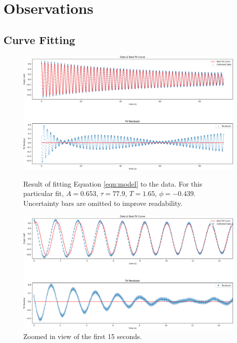 \documentclass[aps,twocolumn,secnumarabic,nobalancelastpage,amsmath,amssymb,nofootinbib]{revtex4}
\begin{document}

\section{Observations}

\subsection{Curve Fitting}

\begin{figure}[htb]
    \includegraphics[width=0.725\linewidth]{fit1.png}
    \caption{Result of fitting Equation \ref{eqn:model} to the data. For this particular fit, \(A = 0.653\),
    \(\tau = 77.9\), \(T = 1.65\), \(\phi = -0.439\). Uncertainty bars are omitted to improve readability.}
    \label{fig:fit}
    \includegraphics[width=0.725\linewidth]{fit2.png}
    \caption{Zoomed in view of the first 15 seconds.}
    \label{fig:fitzoom}
\end{figure}
\end{document}
